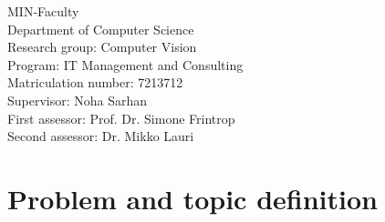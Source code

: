 \documentclass[11pt,a4paper]{scrbook}
\begin{document}
\begin{titlepage}
\noindent
MIN-Faculty \vspace*{0.25cm} \\
Department of Computer Science\vspace*{0.25cm} \\
Research group: Computer Vision\vspace*{0.25cm} \\
Program: IT Management and Consulting\vspace*{0.25cm} \\
Matriculation number: 7213712 \vspace*{0.5cm} \\
Supervisor: Noha Sarhan \vspace*{0.25cm} \\
First assessor: Prof. Dr. Simone Frintrop \vspace*{0.25cm} \\
Second assessor: Dr. Mikko Lauri

\end{titlepage}

\restoregeometry

\tableofcontents

\mainmatter
\setlength{\parindent}{1cm}


\chapter{Problem and topic definition}

\end{document}
